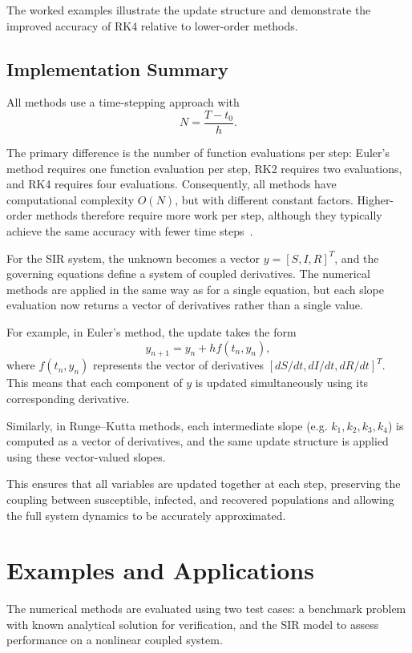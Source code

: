 \documentclass{article}
\begin{document}
The worked examples illustrate the update structure and demonstrate the improved accuracy of RK4 relative to lower-order methods.

\FloatBarrier

\subsection{Implementation Summary}

All methods use a time-stepping approach with
\[
N = \frac{T - t_0}{h}.
\]

The primary difference is the number of function evaluations per step:
Euler’s method requires one function evaluation per step, RK2 requires two evaluations, and RK4 requires four evaluations. Consequently, all methods have computational complexity $O(N)$, but with different constant factors. Higher-order methods therefore require more work per step, although they typically achieve the same accuracy with fewer time steps~\cite{20}.

For the SIR system, the unknown becomes a vector \( y = [S, I, R]^T \), and the governing equations define a system of coupled derivatives. The numerical methods are applied in the same way as for a single equation, but each slope evaluation now returns a vector of derivatives rather than a single value.

For example, in Euler’s method, the update takes the form
\[
y_{n+1} = y_n + h f(t_n, y_n),
\]
where \( f(t_n, y_n) \) represents the vector of derivatives \( [dS/dt, dI/dt, dR/dt]^T \). This means that each component of \( y \) is updated simultaneously using its corresponding derivative.

Similarly, in Runge--Kutta methods, each intermediate slope (e.g. \( k_1, k_2, k_3, k_4 \)) is computed as a vector of derivatives, and the same update structure is applied using these vector-valued slopes.

This ensures that all variables are updated together at each step, preserving the coupling between susceptible, infected, and recovered populations and allowing the full system dynamics to be accurately approximated.

\section{Examples and Applications}
The numerical methods are evaluated using two test cases: a benchmark problem with known analytical solution for verification, and the SIR model to assess performance on a nonlinear coupled system.
\end{document}
